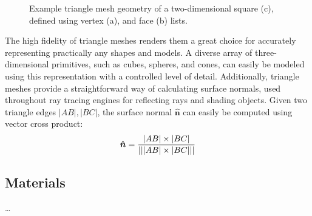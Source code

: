 \begin{figure}[!ht]
\begin{subfigure}{.35\textwidth}
        \caption{}
    \end{subfigure}

    \caption[Example triangle mesh geometry of a two-dimensional square]{
        Example triangle mesh geometry of a two-dimensional square (c), defined using vertex (a), and face (b) lists.}
    \label{fig:Implementation/SceneRepresentation/mesh}
\end{figure}

The high fidelity of triangle meshes renders them a great choice for accurately representing practically any shapes and models.
A diverse array of three-dimensional primitives, such as cubes, spheres, and cones, can easily be modeled using this representation with a controlled level of detail. 
Additionally, triangle meshes provide a straightforward way of calculating surface normals, used throughout ray tracing engines for reflecting rays and shading objects.
Given two triangle edges $ |AB|, |BC| $, the surface normal $ \bm{\hat{n}} $ can easily be computed using vector cross product:
%
\begin{equation}
    \bm{\hat{n}} = \frac{|AB|\times|BC|}{\lvert\lvert |AB|\times|BC| \rvert\rvert}
\end{equation}

\subsection{Materials}

\dots

